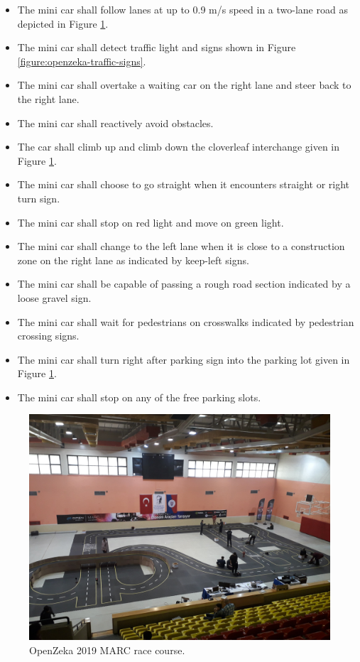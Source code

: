 \begin{itemize}
  \item The mini car shall follow lanes at up to 0.9 m/s speed in a two-lane
    road as depicted in Figure \ref{figure:openzeka-race-course}.
  \item The mini car shall detect traffic light and signs shown in Figure
    \ref{figure:openzeka-traffic-signs}.
  \item The mini car shall overtake a waiting car on the right lane and steer
    back to the right lane.
  \item The mini car shall reactively avoid obstacles.
  \item The car shall climb up and climb down the cloverleaf interchange given
    in Figure \ref{figure:openzeka-race-course}.
  \item The mini car shall choose to go straight when it encounters straight or
    right turn sign.
  \item The mini car shall stop on red light and move on green light.
  \item The mini car shall change to the left lane when it is close to a
    construction zone on the right lane as indicated by keep-left signs.
  \item The mini car shall be capable of passing a rough road section indicated
    by a loose gravel sign.
  \item The mini car shall wait for pedestrians on crosswalks indicated by
    pedestrian crossing signs.
  \item The mini car shall turn right after parking sign into the parking lot
    given in Figure \ref{figure:openzeka-race-course}.
  \item The mini car shall stop on any of the free parking slots.
\end{itemize}

\begin{figure}[h]
  \centering
  \includegraphics[width=.8\textwidth]{figures/openzeka-race-course.jpeg}
  \caption[OpenZeka 2019 MARC race course]{OpenZeka 2019 MARC race course.}
  \label{figure:openzeka-race-course}
\end{figure}

